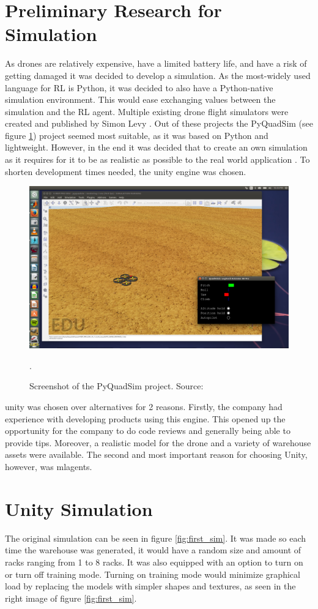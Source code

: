 \section{Preliminary Research for Simulation}
As drones are relatively expensive, have a limited battery life, and have a risk of getting damaged it was decided to develop a simulation. As the most-widely used language for \gls{RL} is Python, it was decided to also have a Python-native simulation environment. This would ease exchanging values between the simulation and the \gls{RL} agent. Multiple existing drone flight simulators were created and published by Simon Levy \citep{simon_github}. Out of these projects the PyQuadSim (see figure \ref{fig:pyquadsim}) project seemed most suitable, as it was based on Python and lightweight. However, in the end it was decided that to create an own simulation as it requires for it to be as realistic as possible to the real world application \citep{mit_rl}. To shorten development times needed, the \gls{unity} engine was chosen.
\begin{figure}[h]
	\centering
	\includegraphics[width=0.75\linewidth]{img/pyquadsim}
	\label{fig:pyquadsim}
	\caption[Screenshot of the PyQuadSim project]{Screenshot of the PyQuadSim project. Source: \citep{pyquadsim}}.
\end{figure}
\pagebreak

\gls{unity} was chosen over alternatives for 2 reasons. Firstly, the company had experience with developing products using this engine. This opened up the opportunity for the company to do code reviews and generally being able to provide tips. Moreover, a realistic model for the drone and a variety of warehouse assets were available. The second and most important reason for choosing Unity, however, was \gls{mlagents}.

\section{Unity Simulation}
The original simulation can be seen in figure \ref{fig:first_sim}. It was made so each time the warehouse was generated, it would have a random size and amount of racks ranging from 1 to 8 racks. It was also equipped with an option to turn on or turn off training mode. Turning on training mode would minimize graphical load by replacing the models with simpler shapes and textures, as seen in the right image of figure \ref{fig:first_sim}.

